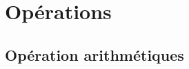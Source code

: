 \documentclass[12pt,a4paper,openany]{book}
\begin{document}
	\setcounter{tocdepth}{2}
	\setcounter{secnumdepth}{3}
	\maketitle
	\tableofcontents
	\chapter{Opérations}
	\section{Opération arithmétiques}
	
	

	

	
\end{document}
